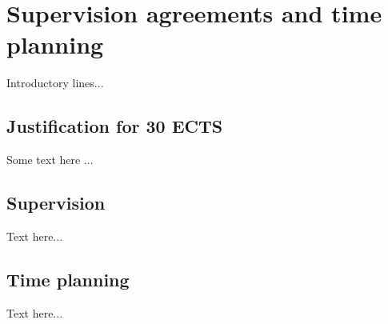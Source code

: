 \chapter{Supervision agreements and time planning} 

Introductory lines...

\section{Justification for 30 ECTS}

Some text here ...

\section{Supervision}

Text here...

\section{Time planning}

Text here...